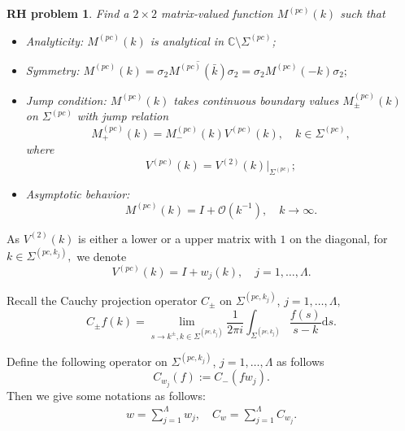 \documentclass[11pt]{article}
\numberwithin{equation}{section}
\newtheorem{RHP}{RH problem}
\begin{document}
\begin{RHP}\label{rhp14}
    Find a $2 \times 2$ matrix-valued function $M^{(pc)}(k)$ such that
    \begin{itemize}
        \item Analyticity: $M^{(pc)}(k)$ is analytical in  $\mathbb{C}\setminus\Sigma^{(pc)}$;
        \item Symmetry: $M^{(pc)}(k)=\sigma_2 \overline{ M^{(pc)}(\bar{k})}\sigma_2=\sigma_2 M^{(pc)}(-k)\sigma_2;$
        \item Jump condition:  $M^{(pc)}(k)$ takes continuous boundary values $M^{(pc)}_\pm(k)$ on $\Sigma^{(pc)}$ with jump relation
\begin{equation*}
M_+^{(pc)}(k) = M_-^{(pc)}(k)V^{(pc)}(k), \quad k \in \Sigma^{(pc)},
\end{equation*}
where
\begin{equation*}
    V^{(pc)}(k)=V^{(2)}(k)|_{\Sigma^{(pc)}};
\end{equation*}
\item Asymptotic behavior:
\begin{equation*}
    M^{(pc)}(k)=I+\mathcal{O}(k^{-1}),\quad k\to\infty.
\end{equation*}
    \end{itemize}
\end{RHP}

 As $V^{(2)}(k)$ is either a lower or a upper matrix with $1$ on the diagonal, for $k\in\Sigma^{(pc,k_j)},$ we denote
 \begin{equation*}
     V^{(pc)}(k)=I+w_{j}(k),\quad j=1,\dots,\Lambda.
 \end{equation*}

Recall the Cauchy projection operator $C_\pm$ on $\Sigma^{(pc,k_j)}$, $j= 1,\dots, \Lambda,$
\begin{equation*}
C_\pm f(k) = \lim_{s \to k^{\pm}, k \in \Sigma^{(pc,k_j)}} \frac{1}{2\pi i} \int_{\Sigma^{(pc,k_j)}} \frac{f(s)}{s - k} \mathrm{d}s.
\end{equation*}



Define the following operator on $\Sigma^{(pc,k_j)}$, $j = 1,\dots, \Lambda$ as follows
\begin{equation*}
    C_{w_{j}}(f) := C_-\left(f w_{j}\right).
\end{equation*}
 Then we give some notations as follows:
\begin{align*}
     w=\sum_{j=1}^\Lambda w_j,\quad C_w=\sum_{j=1}^\Lambda C_{w_j}.
\end{align*}
\end{document}
